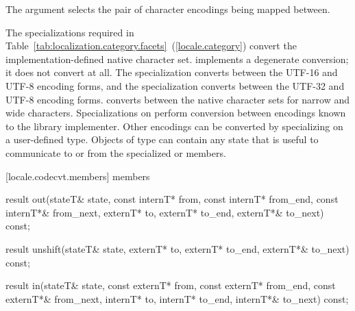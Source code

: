 \pnum
The
argument selects the pair of character encodings being mapped between.

\pnum
The specializations required in Table~\ref{tab:localization.category.facets}~(\ref{locale.category})
convert the implementation-defined native character set.
implements a degenerate conversion;
it does not convert at all.
The specialization  
converts between the UTF-16 and UTF-8 encoding forms, and
the specialization  
converts between the UTF-32 and UTF-8 encoding forms.
converts between the native character sets for narrow and wide characters.
Specializations on
perform conversion between encodings known to the library implementer.
Other encodings can be converted by specializing on a user-defined
type.
Objects of type
can contain any state that is useful to communicate to or from
the specialized
or
members.

[locale.codecvt.members]{ members}

%
%
\begin{itemdecl}
result out(stateT& state,
  const internT* from, const internT* from_end, const internT*& from_next,
        externT* to, externT* to_end, externT*& to_next) const;
\end{itemdecl}

\begin{itemdescr}
\pnum
\returns
{}
\end{itemdescr}

%
%
\begin{itemdecl}
result unshift(stateT& state,
        externT* to, externT* to_end, externT*& to_next) const;
\end{itemdecl}

\begin{itemdescr}
\pnum
\returns
{}
\end{itemdescr}

%
%
\begin{itemdecl}
result in(stateT& state,
  const externT* from, const externT* from_end, const externT*& from_next,
        internT* to, internT* to_end, internT*& to_next) const;
\end{itemdecl}


